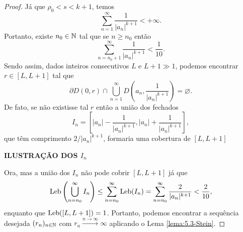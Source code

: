     \begin{proof}
        Já que $\rho_0 < s < k+1$, temos
        \begin{equation*}
            \sum_{n=1}^{\infty} \frac{1}{|a_n|^{k+1}} < +\infty.
        \end{equation*}
        Portanto, existe $n_0\in\mathbb{N}$ tal que se $n\geq n_0$ então
        \begin{equation*}
            \sum_{n = n_0 + 1}^{\infty} \frac{1}{|a_n|^{k+1}} < \frac{1}{10}.
        \end{equation*}
        Sendo assim, dados inteiros consecutivos $L$ e $L+1 \gg 1$, podemos
        encontrar $r\in [L, L+1]$ tal que
        \begin{equation*}
            \partial D(0, r) 
            \cap 
            \bigcup_{n=1}^{\infty} D\left( a_n, \frac{1}{|a_n|^{k+1}} \right)
            =
            \varnothing.
        \end{equation*}
        De fato, se não existisse tal $r$ então a união dos fechados
        \begin{equation*}
            I_n = 
            \left[
            |a_n| - \frac{1}{|a_n|^{k+1}}, |a_n| + \frac{1}{|a_n|^{k+1}}
            \right],
        \end{equation*}
        que têm comprimento $2/|a_n|^{k+1}$, formaria uma cobertura de $[L, L+1]$
        \begin{center}
            {\bf ILUSTRAÇÃO DOS $I_n$}
        \end{center}
        Ora, mas a união dos $I_n$ não pode cobrir $[L, L+1]$ já que
        \begin{align*}
            \mathrm{Leb}\left(
            \bigcup_{n=n_0}^{\infty} I_n
            \right) 
            \leq
            \sum_{n=n_0}^{\infty} \mathrm{Leb}(I_n)
            =
            \sum_{n=n_0}^{\infty} \frac{2}{|a_n|^{k+1}}
            <
            \frac{2}{10},
        \end{align*}
        enquanto que $\mathrm{Leb}([L, L+1]) = 1$. Portanto, podemos encontrar 
        a sequência desejada $(r_n)_{n\in\mathbb{N}}$ com $r_n \xrightarrow{n\to\infty} \infty$
        aplicando o Lema \ref{lema:5.3-Stein}.
    \end{proof}
    
    \medskip
    
